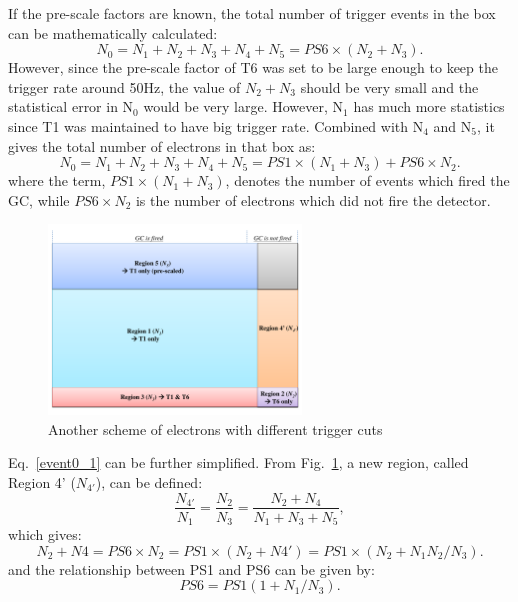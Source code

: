  If the pre-scale factors are known, the total number of trigger events in the box can be mathematically calculated:
\begin{equation}
 N_{0} = N_{1}+N_{2}+N_{3}+N_{4}+N_{5}=PS6\times(N_{2}+N_{3}).
\end{equation}
However, since the pre-scale factor of T6 was set to be large enough to keep the trigger rate around 50Hz, the value of $N_{2}+N_{3}$ should be very small and the statistical error in $\mathrm{N_{0}}$ would be very large. However, $\mathrm{N_{1}}$ has much more statistics since T1 was maintained to have big trigger rate. Combined with $\mathrm{N_{4}}$ and $\mathrm{N_{5}}$, it gives the total number of electrons in that box as:
\begin{equation}
 N_{0} = N_{1}+N_{2}+N_{3}+N_{4}+N_{5}=PS1\times(N_{1}+N_{3})+PS6\times N_{2}.
\label{event0_1}
\end{equation}
where the term, $PS1\times(N_{1}+N_{3})$, denotes the number of events which fired the GC, while $PS6\times N_{2}$ is the number of electrons which did not fire the detector. 

\begin{figure}[!ht]
 \begin{center}
  \includegraphics[width=0.6\textwidth]{./figures/trigger/trigger_region2}
  \caption[Another scheme of electrons with different trigger cuts]{Another scheme of electrons with different trigger cuts}
  \label{trig_region2}
 \end{center}
\end{figure}

Eq.~\ref{event0_1} can be further simplified. From Fig.~\ref{trig_region2}, a new region, called Region 4' ($N_{4'}$), can be defined:
\begin{equation}
\frac{N_{4'}}{N_{1}}=\frac{N_{2}}{N_{3}}=\frac{N_{2}+N_{4}}{N_{1}+N_{3}+N_{5}},
\end{equation}
which gives:
\begin{equation}
 N_{2}+N{4} = PS6\times N_{2} = PS1\times(N_{2}+N{4'}) = PS1\times(N_{2}+N_{1}N_{2}/N_{3}).
\end{equation}
and the relationship between PS1 and PS6 can be given by:
\begin{equation}
 PS6 = PS1(1+N_{1}/N_{3}).
\end{equation}

